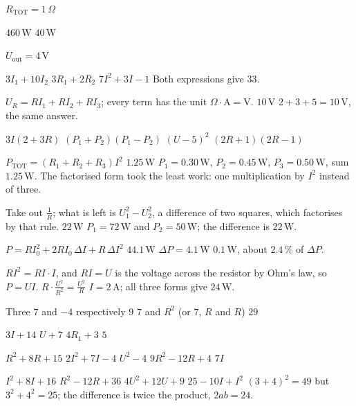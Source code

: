 
\begin{facit}

 $R_{\text{TOT}} = 1\,\Omega$

  $460\,\text{W}$  $40\,\text{W}$

 $U_{\text{out}} = 4\,\text{V}$

  $3I_1 + 10I_2$  $3R_1 + 2R_2$  $7I^2 + 3I - 1$
 Both expressions give $33$.

  $U_R = RI_1 + RI_2 + RI_3$; every term has the unit $\Omega \cdot \text{A} =
\text{V}$.  $10\,\text{V}$  $2 + 3 + 5 = 10\,\text{V}$, the same answer.

  $3I(2 + 3R)$  $(P_1 + P_2)(P_1 - P_2)$  $(U - 5)^2$
 $(2R + 1)(2R - 1)$

  $P_{\text{TOT}} = (R_1 + R_2 + R_3)I^2$  $1.25\,\text{W}$
 $P_1 = 0.30\,\text{W}$, $P_2 = 0.45\,\text{W}$, $P_3 = 0.50\,\text{W}$, sum
$1.25\,\text{W}$. The factorised form took the least work: one multiplication by $I^2$ instead of
three.

  Take out $\frac{1}{R}$; what is left is $U_1^2 - U_2^2$, a difference of two
squares, which factorises by that rule.  $22\,\text{W}$
 $P_1 = 72\,\text{W}$ and $P_2 = 50\,\text{W}$; the difference is $22\,\text{W}$.

  $P = RI_0^2 + 2RI_0\,\Delta I + R\,\Delta I^2$  $44.1\,\text{W}$
 $\Delta P = 4.1\,\text{W}$  $0.1\,\text{W}$, about $2.4\,\%$ of $\Delta P$.

  $RI^2 = RI \cdot I$, and $RI = U$ is the voltage across the resistor by Ohm's
law, so $P = UI$.  $R \cdot \frac{U^2}{R^2} = \frac{U^2}{R}$
 $I = 2\,\text{A}$; all three forms give $24\,\text{W}$.

  Three  $7$ and $-4$ respectively  $9$
 $7$ and $R^2$ (or $7$, $R$ and $R$)  $29$

  $3I + 14$  $U + 7$  $4R_1 + 3$  $5$

  $R^2 + 8R + 15$  $2I^2 + 7I - 4$  $U^2 - 4$
 $9R^2 - 12R + 4$  $7I$

  $I^2 + 8I + 16$  $R^2 - 12R + 36$  $4U^2 + 12U + 9$
 $25 - 10I + I^2$  $(3 + 4)^2 = 49$ but $3^2 + 4^2 = 25$; the difference is twice the
product, $2ab = 24$.


\end{facit}
